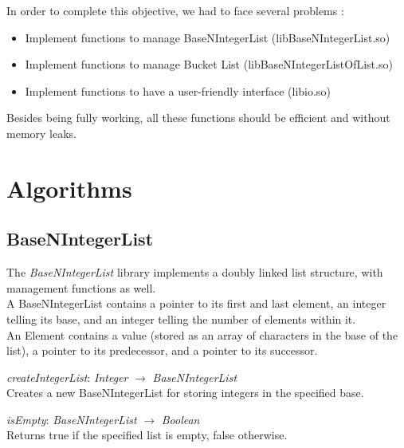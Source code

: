 \documentclass[book, backcover, english, nodocumentinfo]{upmethodology-document}
\begin{document}
In order to complete this objective, we had to face several problems :
\begin{itemize}
	\item{} Implement functions to manage BaseNIntegerList (libBaseNIntegerList.so)
	\item{} Implement functions to manage Bucket List (libBaseNIntegerListOfList.so)
	\item{} Implement functions to have a user-friendly interface (libio.so)
\end{itemize}

Besides being fully working, all these functions should be efficient and without memory leaks.

\chapter{Algorithms} \label{chapter:Algorithms}
	\section{BaseNIntegerList}
	The \textit{BaseNIntegerList} library implements a doubly linked list structure, with management functions as well.\\
	A BaseNIntegerList contains a pointer to its first and last element, an integer telling its base, and an integer telling the number of elements within it.\\
	An Element contains a value (stored as an array of characters in the base of the list), a pointer to its predecessor, and a pointer to its successor.\\

		\begin{minipage}{\linewidth}
			\textit{createIntegerList}: \textit{Integer} $\rightarrow$ \textit{BaseNIntegerList}\\
			Creates a new BaseNIntegerList for storing integers in the specified base.
			\label{algo:BNIL-CreateIntegerList}
			
		\end{minipage}
		\nxtalgo{}

		\begin{minipage}{\linewidth}
			\textit{isEmpty}: \textit{BaseNIntegerList} $\rightarrow$ \textit{Boolean}\\
			Returns true if the specified list is empty, false otherwise.
			\label{algo:BNIL-IsEmpty}
			
		\end{minipage}
		\nxtalgo{}
\end{document}
